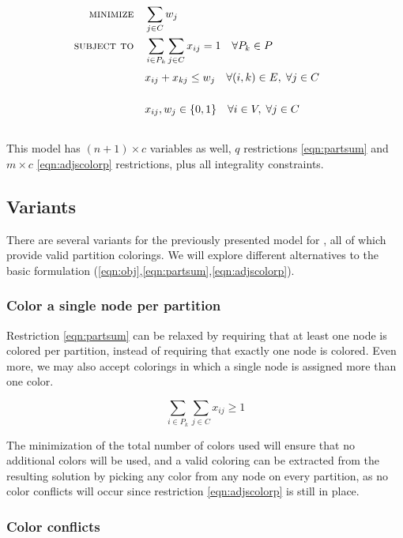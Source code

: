 \begin{align}
\text{\textsc{minimize}} \quad & \sum_{j \in C} w_j \label{eqn:obj} \\
\text{\textsc{subject to}} \quad & \sum_{i \in P_k} \sum_{j \in C} x_{ij} = 1 \quad \forall P_k \in P \label{eqn:partsum} \\
& x_{ij} + x_{kj} \leq w_j \quad \forall (i,k) \in E, \; \forall j \in C \sumheight \label{eqn:adjscolorp}\\
& x_{ij}, w_{j} \in \{0,1\} \quad \forall i \in V, \; \forall j \in C \sumheight \nonumber
\end{align}

This model has $(n + 1) \times c$ variables as well, $q$ restrictions \ref{eqn:partsum} and $m \times c$ \ref{eqn:adjscolorp} restrictions, plus all integrality constraints.

\subsection{Variants}

There are several variants for the previously presented model for \PCP{}, all of which provide valid partition colorings. We will explore different alternatives to the basic formulation (\ref{eqn:obj},\ref{eqn:partsum},\ref{eqn:adjscolorp}).

\subsubsection{Color a single node per partition}

Restriction \ref{eqn:partsum} can be relaxed by requiring that at least one node is colored per partition, instead of requiring that exactly one node is colored. Even more, we may also accept colorings in which a single node is assigned more than one color. 

\begin{equation}
\label{eqn:partsumgeq}
\sum_{i \in P_k} \sum_{j \in C} x_{ij} \geq 1
\end{equation}

The minimization of the total number of colors used will ensure that no additional colors will be used, and a valid coloring can be extracted from the resulting solution by picking any color from any node on every partition, as no color conflicts will occur since restriction \ref{eqn:adjscolorp} is still in place.

\subsubsection{Color conflicts}

